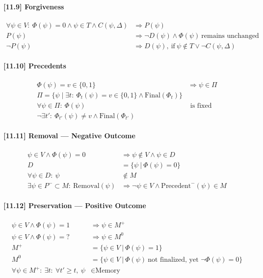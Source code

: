 \documentclass[12pt]{article}
\begin{document}
\paragraph{[11.9] Forgiveness}
\begin{align*}
\forall \psi \in V:\ \Phi(\psi) = 0 \land \psi \in T \land C(\psi, \Delta) &\Rightarrow P(\psi) \\
P(\psi) &\Rightarrow \neg D(\psi) \land \Phi(\psi)\ \text{remains unchanged} \\
\neg P(\psi) &\Rightarrow D(\psi),\ \text{if}\ \psi \notin T \lor \neg C(\psi, \Delta)
\end{align*}

\paragraph{[11.10] Precedents}
\begin{align*}
\Phi(\psi) = v \in \{0,1\} &\Rightarrow \psi \in \Pi \\
\Pi = \{\psi \mid \exists t:\ \Phi_t(\psi) = v \in \{0,1\} \land \text{Final}(\Phi_t)\} \\
\forall \psi \in \Pi:\ \Phi(\psi) &\text{ is fixed} \\
\neg \exists t':\ \Phi_{t'}(\psi) \neq v \land \text{Final}(\Phi_{t'})
\end{align*}

\paragraph{[11.11] Removal — Negative Outcome}
\begin{align*}
\psi \in V \land \Phi(\psi) = 0 &\Rightarrow \psi \notin V \land \psi \in D \\
D &= \{\psi \ |\ \Phi(\psi) = 0\} \\
\forall \psi \in D:\ \psi &\notin M \\
\exists \psi \in P^- \subset M:\ \text{Removal}(\psi) &\Rightarrow \neg \psi \in V \land \text{Precedent}^-(\psi) \in M
\end{align*}

\paragraph{[11.12] Preservation — Positive Outcome}
\begin{align*}
\psi \in V \land \Phi(\psi) = 1 &\Rightarrow \psi \in M^+ \\
\psi \in V \land \Phi(\psi) = ? &\Rightarrow \psi \in M^0 \\
M^+ &= \{\psi \in V\ |\ \Phi(\psi) = 1\} \\
M^0 &= \{\psi \in V\ |\ \Phi(\psi)\ \text{not finalized, yet } \neg\Phi(\psi) = 0\} \\
\forall \psi \in M^+:\ \exists t:\ \forall t' \geq t,\ \psi &\in \text{Memory}
\end{align*}
\end{document}
